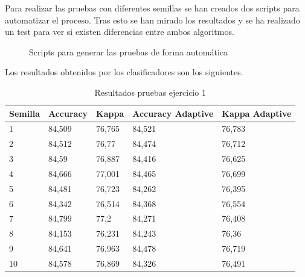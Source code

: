 Para realizar las pruebas con diferentes semillas se han creados dos scripts para automatizar el proceso. Tras esto se han mirado los resultados y se ha realizado un test para ver si existen diferencias entre ambos algoritmos.

\begin{figure}[H]
	\centering
	\caption{Scripts para generar las pruebas de forma automática}
	\label{fig:scripts1}
\end{figure}

Los resultados obtenidos por los clasificadores son los siguientes.
\begin{table}[H]
	\begin{tabular}{lllll}
		\textbf{Semilla} & \textbf{Accuracy} & \textbf{Kappa} & \textbf{Accuracy Adaptive} & \textbf{Kappa Adaptive} \\ \hline
		1                & 84,509            & 76,765         & 84,521                     & 76,783                  \\
		2                & 84,512            & 76,77          & 84,474                     & 76,712                  \\
		3                & 84,59             & 76,887         & 84,416                     & 76,625                  \\
		4                & 84,666            & 77,001         & 84,465                     & 76,699                  \\
		5                & 84,481            & 76,723         & 84,262                     & 76,395                  \\
		6                & 84,342            & 76,514         & 84,368                     & 76,554                  \\
		7                & 84,799            & 77,2           & 84,271                     & 76,408                  \\
		8                & 84,153            & 76,231         & 84,243                     & 76,36                   \\
		9                & 84,641            & 76,963         & 84,478                     & 76,719                  \\
		10               & 84,578            & 76,869         & 84,326                     & 76,491                 
	\end{tabular}
\label{table:1}
\caption{Resultados pruebas ejercicio 1}
\end{table}

